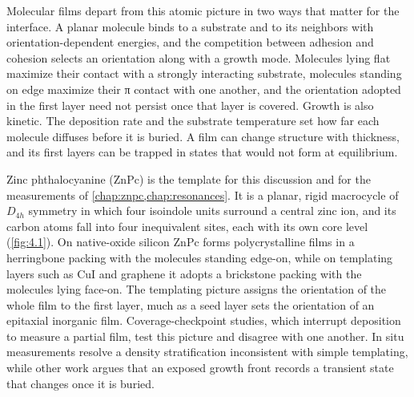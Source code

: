 Molecular films depart from this atomic picture in two ways that matter for the interface. A planar molecule binds to a substrate and to its neighbors with orientation-dependent energies, and the competition between adhesion and cohesion selects an orientation along with a growth mode.\autocite{forrestUltrathinOrganicFilms1997,witteGrowthAromaticMolecules2004} Molecules lying flat maximize their contact with a strongly interacting substrate, molecules standing on edge maximize their π contact with one another, and the orientation adopted in the first layer need not persist once that layer is covered. Growth is also kinetic. The deposition rate and the substrate temperature set how far each molecule diffuses before it is buried. A film can change structure with thickness, and its first layers can be trapped in states that would not form at equilibrium.\autocite{kowarikOrganicMolecularBeam2008}

Zinc phthalocyanine (ZnPc) is the template for this discussion and for the measurements of \cref{chap:znpc,chap:resonances}. It is a planar, rigid macrocycle of \(D_{4h}\) symmetry in which four isoindole units surround a central zinc ion, and its carbon atoms fall into four inequivalent sites, each with its own core level (\cref{fig:4.1}). On native-oxide silicon ZnPc forms polycrystalline films in a herringbone packing with the molecules standing edge-on, while on templating layers such as CuI and graphene it adopts a brickstone packing with the molecules lying face-on.\autocite{katoMorphologicalOpticalProperties2020a,ngongangndjawaImpactMolecularOrientation2015,schunemannZincPhthalocyanineInfluence2011} The templating picture assigns the orientation of the whole film to the first layer, much as a seed layer sets the orientation of an epitaxial inorganic film. Coverage-checkpoint studies, which interrupt deposition to measure a partial film, test this picture and disagree with one another. In situ measurements resolve a density stratification inconsistent with simple templating\autocite{derrienInterfacialRearrangementsStrain2022}, while other work argues that an exposed growth front records a transient state that changes once it is buried.\autocite{yamamotoVariationZincPhthalocyanine2022,deoteyzaStructuralRearrangementsInitial2006}

